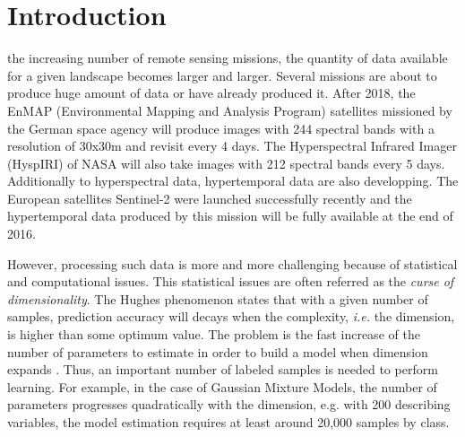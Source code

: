 \documentclass[journal]{IEEEtran}
\begin{document}

%
\IEEEpeerreviewmaketitle

\section{Introduction}
\label{sec:intro}

 the increasing number of remote sensing missions, the quantity of data available for a given landscape becomes larger and larger. Several missions are about to produce huge amount of data or have already produced it. After 2018, the EnMAP (Environmental Mapping and Analysis Program) satellites missioned by the German space agency will produce images with 244 spectral bands with a resolution of 30x30m and revisit every 4 days\cite{Müller09enmap}. The Hyperspectral Infrared Imager (HyspIRI) of NASA will also take images with 212 spectral bands every 5 days. Additionally to hyperspectral data, hypertemporal data are also developping. The European satellites Sentinel-2 were launched successfully recently and the hypertemporal data produced by this mission will be fully available at the end of 2016\cite{drusch2012sentinel}.

However, processing such data is more and more challenging because of statistical and computational issues. This statistical issues are often referred as the \emph{curse of dimensionality}. The Hughes phenomenon \cite{hughes1968mean} states that with a given number of samples, prediction accuracy will decays when the complexity, \emph{i.e.} the dimension, is higher than some optimum value. The problem is the fast increase of the number of parameters to estimate in order to build a model when dimension expands \cite{bouveyron2014model}. Thus, an important number of labeled samples is needed to perform learning. For example, in the case of Gaussian Mixture Models, the number of parameters progresses quadratically with the dimension, e.g. with 200 describing variables, the model estimation requires at least around 20,000 samples by class.
\end{document}
